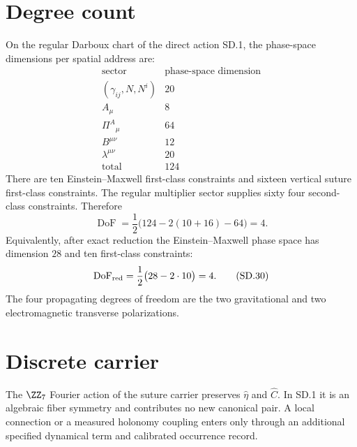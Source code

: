 \documentclass[10pt]{article}
\newcommand{\hateta}{\widehat\eta}
\newcommand{\hatC}{\widehat C}
\newcommand{\DoF}{\operatorname{DoF}}
\begin{document}
\section{Degree count}

On the regular Darboux chart of the direct action SD.1, the phase-space
dimensions per spatial address are:
\[
\begin{array}{c|c}
\text{sector}&\text{phase-space dimension}\\ \hline
(\gamma_{ij},N,N^i) &20\\
A_\mu &8\\
\Pi^A{}_{\mu}&64\\
B^{\mu\nu}&12\\
\lambda^{\mu\nu}&20\\ \hline
\text{total}&124
\end{array}
\tag{SD.28}
\]
There are ten Einstein--Maxwell first-class constraints and sixteen vertical
suture first-class constraints. The regular multiplier sector supplies sixty
four second-class constraints. Therefore
\[
\DoF=
\frac12\bigl(124-2(10+16)-64\bigr)=4.
\tag{SD.29}
\]
Equivalently, after exact reduction the Einstein--Maxwell phase space has
dimension $28$ and ten first-class constraints:
\[
\DoF_{\rm red}=\frac12\bigl(28-2\cdot10\bigr)=4.
\tag{SD.30}
\]
The four propagating degrees of freedom are the two gravitational and two
electromagnetic transverse polarizations.

\section{Discrete carrier}

The $\ZZ_7$ Fourier action of the suture carrier preserves $\hateta$ and
$\hatC$. In SD.1 it is an algebraic fiber symmetry and contributes no new
canonical pair. A local connection or a measured holonomy coupling enters
only through an additional specified dynamical term and calibrated
occurrence record.
\end{document}
